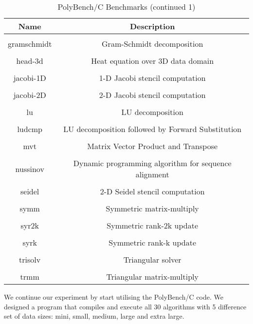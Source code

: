\begin{table}[h!]
\centering
\begin{tabular}{||c c||} 
\hline
Name & Description \\ [1ex] 
\hline\hline
 & \\
gramschmidt & Gram-Schmidt decomposition \\ 
 & \\
head-3d & Heat equation over 3D data domain \\ 
 & \\
jacobi-1D & 1-D Jacobi stencil computation \\ 
 & \\
jacobi-2D & 2-D Jacobi stencil computation \\ 
 & \\
lu & LU decomposition \\ 
 & \\
ludcmp & LU decomposition followed by Forward Substitution \\ 
 & \\
mvt & Matrix Vector Product and Transpose \\ 
 & \\
nussinov & Dynamic programming algorithm for sequence alignment \\ 
 & \\
seidel & 2-D Seidel stencil computation \\ 
 & \\
symm & Symmetric matrix-multiply \\ 
 & \\
syr2k & Symmetric rank-2k update \\ 
 & \\
syrk & Symmetric rank-k update \\ 
 & \\
trisolv & Triangular solver \\ 
 & \\
trmm & Triangular matrix-multiply \\ [1ex]
\hline
\end{tabular}
\caption{PolyBench/C Benchmarks (continued 1)}
\label{table:time_complexity_2}
\end{table}

We continue our experiment by start utilising the PolyBench/C code. We designed a program that compiles and execute all 30 algorithms with 5 difference set of data sizes: mini, small, medium, large and extra large.

